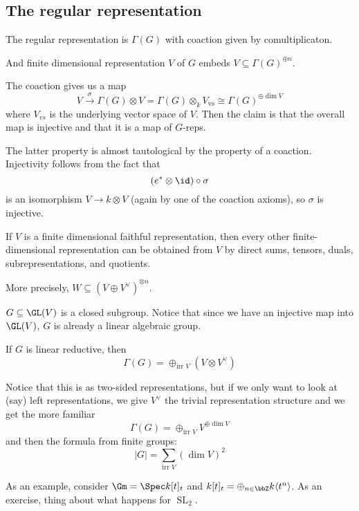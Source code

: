 \documentclass[12pt]{article}
\DeclareMathOperator{\SL}{SL}
\begin{document}
\subsection{The regular representation}
The regular representation is $\Gamma(G)$ with coaction given by comultiplicaton.
\begin{prop}
	And finite dimensional representation $V$ of $G$ embeds $V\subseteq \Gamma(G)^{\oplus n}$.
\end{prop}
\begin{prf}
	The coaction gives us a map 
	\[V\xrightarrow{\sigma}\Gamma(G)\otimes V=\Gamma(G)\otimes_k V_{\text{vs}}\cong \Gamma(G)^{\oplus\dim V}\]
	where $V_{vs}$ is the underlying vector space of $V$. Then the claim is that the overall map is injective and that it is a map of $G$-reps.

	The latter property is almost tautological by the property of a coaction. Injectivity follows from the fact that 
	\[(e^\ast\otimes\id)\circ\sigma\]
	is an isomorphism $V\to k\otimes V$ (again by one of the coaction axioms), so $\sigma$ is injective.
\end{prf}
\begin{prop}
	If $V$ is a finite dimensional faithful representation, then every other finite-dimensional representation can be obtained from $V$ by direct sums, tensors, duals, subrepresentations, and quotients.
\end{prop}
\begin{rmk}
	More precisely, $W\subseteq (V\oplus V^\vee)^{\otimes n}$.
\end{rmk}
\begin{prf}
	$G\subseteq\GL(V)$ is a closed subgroup. Notice that since we have an injective map into $\GL(V)$, $G$ is already a linear algebraic group.
\end{prf}
\begin{thm}
	If $G$ is linear reductive, then 
	\[\Gamma(G)=\oplus_{\text{irr $V$}}(V\otimes V^\vee)\]
\end{thm}
\begin{rmk}
	Notice that this is as two-sided representations, but if we only want to look at (say) left representations, we give $V^\vee$ the trivial 
	representation structure and we get the more familiar 
	\[\Gamma(G)=\oplus_{\text{irr $V$}} V^{\oplus\dim V}\]
	and then the formula from finite groups:
	\[|G|=\sum_{\text{irr $V$}} (\dim V)^2\]
\end{rmk}
As an example, consider $\Gm=\Spec k[t]_t$ and $k[t]_t=\oplus_{n\in\bbZ}k\langle t^n\rangle$. As an exercise, thing about what happens for $\SL_2$.
\end{document}
